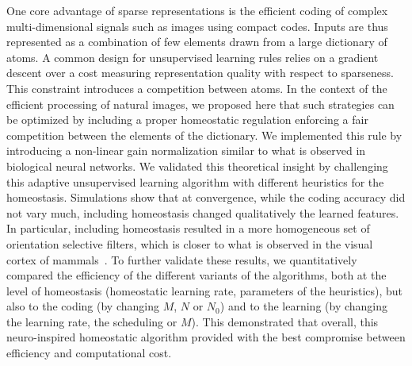 \documentclass[vision,article,submit,oneauthor,pdftex]{Definitions/mdpi}
\begin{document}
One core advantage of sparse representations is the efficient coding of complex multi-dimensional signals such as images using compact codes. Inputs are thus represented as a combination of few elements drawn from a large dictionary of atoms. A common design for unsupervised learning rules relies on a gradient descent over a cost measuring representation quality with respect to sparseness. This constraint introduces a competition between atoms. In the context of the efficient processing of natural images, we proposed here that such strategies can be optimized by including a proper homeostatic regulation enforcing a fair competition between the elements of the dictionary. We implemented this rule by introducing a non-linear gain normalization similar to what is observed in biological neural networks. We validated this theoretical insight by challenging this adaptive unsupervised learning algorithm with different heuristics for the homeostasis. Simulations show that at convergence, while the coding accuracy did not vary much, including homeostasis changed qualitatively the learned features. In particular, including homeostasis resulted in a more homogeneous set of orientation selective filters, which is closer to what is observed in the visual cortex of mammals~\citep{Ringach02,Rehn07,Loxley17}. To further validate these results, we quantitatively compared the efficiency of the different variants of the algorithms, both at the level of homeostasis (homeostatic learning rate, parameters of the heuristics), but also to the coding (by changing $M$, $N$ or $N_0$) and to the learning (by changing the learning rate, the scheduling or $M$). This demonstrated that overall, this neuro-inspired homeostatic algorithm provided with the best compromise between efficiency and computational cost.
\end{document}
